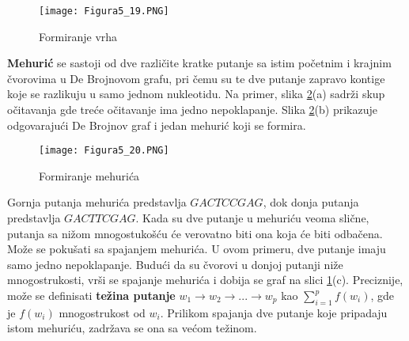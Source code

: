 \documentclass[12pt,oneside]{memoir}
\begin{document}
\begin{figure}[!ht]
\centering
\texttt{[image: Figura5\_19.PNG]}
\caption{Formiranje vrha \cite{WingKinSung}}
\label{fig:13}
\end{figure}


\textbf{Mehurić} se sastoji od dve različite kratke putanje sa istim početnim i
krajnim čvorovima u De Brojnovom grafu, pri čemu su te dve putanje zapravo kontige koje se razlikuju u samo jednom nukleotidu. Na primer, slika \ref{fig:133}(a) sadrži skup očitavanja gde treće očitavanje ima jedno nepoklapanje. Slika \ref{fig:133}(b) prikazuje odgovarajući De Brojnov graf i jedan mehurić koji se formira.

\begin{figure}[!ht]
\centering
\texttt{[image: Figura5\_20.PNG]}
\caption{Formiranje mehurića \cite{WingKinSung}}
\label{fig:133}
\end{figure}

\noindent Gornja putanja mehurića predstavlja $GACTCCGAG$, dok donja putanja predstavlja $GACTTCGAG$. Kada su dve putanje u mehuriću veoma slične, putanja sa nižom mnogostukošću će verovatno biti ona koja će biti odbačena. Može se pokušati sa spajanjem mehurića. U ovom primeru, dve putanje imaju samo jedno nepoklapanje. Budući da su čvorovi u donjoj putanji niže mnogostrukosti, vrši se spajanje mehurića i dobija se graf na slici \ref{fig:13}(c). Preciznije, može se definisati \textbf{težina putanje} $w_1 \rightarrow w_2 \rightarrow ... \rightarrow w_p$ kao $\sum_{i=1}^{p} f(w_i)$, gde je $f(w_i)$ mnogostrukost od $w_i$. Prilikom spajanja dve putanje koje pripadaju istom mehuriću, zadržava se ona sa većom težinom.
\begin{comment}
Za spajanje mehurića, može se koristiti \textbf{algoritam turneje} (engl. \textit{tourbus algorithm}) koji će biti detaljno objašnjen u poglavlju \ref{odeljak:Tourbus}.
\end{comment}
\end{document}
